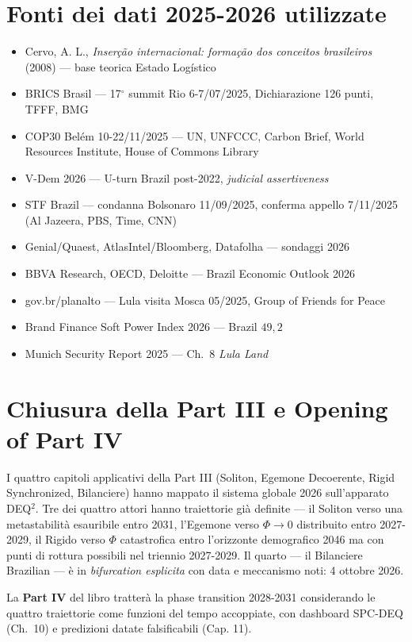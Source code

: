 \section{Fonti dei dati 2025-2026
utilizzate}\label{fonti-dei-dati-2025-2026-utilizzate}

\begin{itemize}
\tightlist
\item
  Cervo, A. L., \emph{Inserção internacional: formação dos conceitos
  brasileiros} (2008) --- base teorica Estado Logístico
\item
  BRICS Brasil --- 17$^\circ$ summit Rio 6-7/07/2025, Dichiarazione 126 punti,
  TFFF, BMG
\item
  COP30 Belém 10-22/11/2025 --- UN, UNFCCC, Carbon Brief, World
  Resources Institute, House of Commons Library
\item
  V-Dem 2026 --- U-turn Brazil post-2022, \emph{judicial assertiveness}
\item
  STF Brazil --- condanna Bolsonaro 11/09/2025, conferma appello
  7/11/2025 (Al Jazeera, PBS, Time, CNN)
\item
  Genial/Quaest, AtlasIntel/Bloomberg, Datafolha --- sondaggi 2026
\item
  BBVA Research, OECD, Deloitte --- Brazil Economic Outlook 2026
\item
  gov.br/planalto --- Lula visita Mosca 05/2025, Group of Friends for
  Peace
\item
  Brand Finance Soft Power Index 2026 --- Brazil \(49{,}2\)
\item
  Munich Security Report 2025 --- Ch.~8 \emph{Lula Land}
\end{itemize}



\section{Chiusura della Part III e Opening of Part
IV}\label{chiusura-della-parte-iii-e-apertura-della-parte-iv}

I quattro capitoli applicativi della Part III (Soliton, Egemone
Decoerente, Rigid Synchronized, Bilanciere) hanno mappato il sistema
globale 2026 sull'apparato DEQ$^2$. Tre dei quattro attori hanno
traiettorie già definite --- il Soliton verso una metastabilità
esauribile entro 2031, l'Egemone verso \(\Phi \to 0\) distribuito entro
2027-2029, il Rigido verso \(\Phi\) catastrofica entro l'orizzonte
demografico 2046 ma con punti di rottura possibili nel triennio
2027-2029. Il quarto --- il Bilanciere Brazilian --- è in
\emph{bifurcation esplicita} con data e meccanismo noti: 4 ottobre
2026.

La \textbf{Part IV} del libro tratterà la phase transition 2028-2031
considerando le quattro traiettorie come funzioni del tempo accoppiate,
con dashboard SPC-DEQ (Ch.~10) e predizioni datate falsificabili (Cap.
11).


